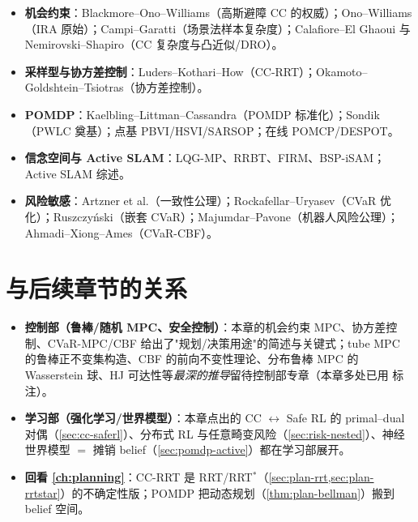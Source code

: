 \begin{itemize}
  \item \textbf{机会约束}：Blackmore--Ono--Williams\cite{blackmore2011chance}（高斯避障 CC 的权威）；Ono--Williams\cite{ono2008iterative}（IRA 原始）；Campi--Garatti\cite{campi2008exact}（场景法样本复杂度）；Calafiore--El Ghaoui\cite{calafiore2006distributionally} 与 Nemirovski--Shapiro\cite{nemirovski2006convex}（CC 复杂度与凸近似/DRO）。
  \item \textbf{采样型与协方差控制}：Luders--Kothari--How\cite{luders2010chance}（CC-RRT）；Okamoto--Goldshtein--Tsiotras\cite{okamoto2018optimal}（协方差控制）。
  \item \textbf{POMDP}：Kaelbling--Littman--Cassandra\cite{kaelbling1998planning}（POMDP 标准化）；Sondik\cite{sondik1971optimal}（PWLC 奠基）；点基 PBVI/HSVI/SARSOP\cite{pineau2003pbvi,smith2004hsvi,kurniawati2008sarsop}；在线 POMCP/DESPOT\cite{silver2010pomcp,somani2013despot}。
  \item \textbf{信念空间与 Active SLAM}：LQG-MP\cite{vandenberg2011lqgmp}、RRBT\cite{bry2011rrbt}、FIRM\cite{aghamohammadi2014firm}、BSP-iSAM\cite{indelman2015bsp}；Active SLAM 综述\cite{placed2023survey}。
  \item \textbf{风险敏感}：Artzner et al.\cite{artzner1999coherent}（一致性公理）；Rockafellar--Uryasev\cite{rockafellar2000optimization}（CVaR 优化）；Ruszczyński\cite{ruszczynski2010risk}（嵌套 CVaR）；Majumdar--Pavone\cite{majumdar2017risk}（机器人风险公理）；Ahmadi--Xiong--Ames\cite{ahmadi2021cvar}（CVaR-CBF）。
\end{itemize}

\section*{与后续章节的关系}
\label{sec:plan-chance-next}

\begin{itemize}
  \item \textbf{控制部（鲁棒/随机 MPC、安全控制）}：本章的机会约束 MPC、协方差控制、CVaR-MPC/CBF 给出了"规划/决策用途"的简述与关键式；tube MPC 的鲁棒正不变集构造、CBF 的前向不变性理论、分布鲁棒 MPC 的 Wasserstein 球、HJ 可达性等\emph{最深的推导}留待控制部专章（本章多处已用  标注）。
  \item \textbf{学习部（强化学习/世界模型）}：本章点出的 CC $\leftrightarrow$ Safe RL 的 primal--dual 对偶（\cref{sec:cc-saferl}）、分布式 RL 与任意畸变风险（\cref{sec:risk-nested}）、神经世界模型 $=$ 摊销 belief（\cref{sec:pomdp-active}）都在学习部展开。
  \item \textbf{回看 \cref{ch:planning}}：CC-RRT 是 RRT/RRT$^*$（\cref{sec:plan-rrt,sec:plan-rrtstar}）的不确定性版；POMDP 把动态规划（\cref{thm:plan-bellman}）搬到 belief 空间。
\end{itemize}

